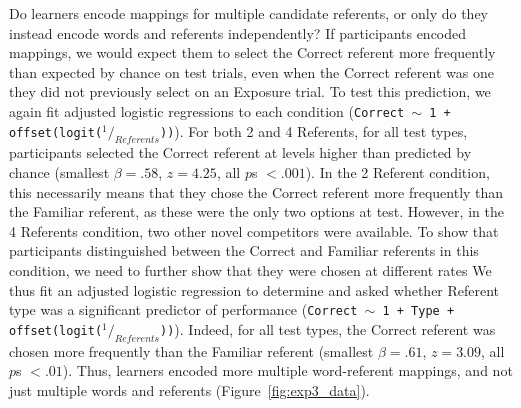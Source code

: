 \documentclass[man,floatsintext]{apa6}
\begin{document}
Do learners encode mappings for multiple candidate referents, or only do they instead encode words and referents independently? If participants encoded mappings, we would expect them to select the Correct referent more frequently than expected by chance on test trials, even when the Correct referent was one they did not previously select on an Exposure trial. To test this prediction, we again fit adjusted logistic regressions to each condition (\small{\tt{Correct $\sim$ 1 + offset(logit($^1/_{Referents}$))}}). For both 2 and 4 Referents, for all test types, participants selected the Correct referent at levels higher than predicted by chance (smallest $\beta =  .58$, $z=4.25$, all $p$s $< .001$). In the 2 Referent condition, this necessarily means that they chose the Correct referent more frequently than the Familiar referent, as these were the only two options at test. However, in the 4 Referents condition, two other novel competitors were available. To show that participants distinguished between the Correct and Familiar referents in this condition, we need to further show that they were chosen at different rates We thus fit an adjusted logistic regression to determine and asked whether Referent type was a significant predictor of performance (\small{\tt{Correct $\sim$ 1 + Type + offset(logit($^1/_{Referents}$))}}). Indeed, for all test types, the Correct referent was chosen more frequently than the Familiar referent (smallest $\beta =  .61$, $z=3.09$, all $p$s $< .01$). Thus, learners encoded more multiple word-referent mappings, and not just multiple words and referents (Figure~\ref{fig:exp3_data}).
\end{document}
